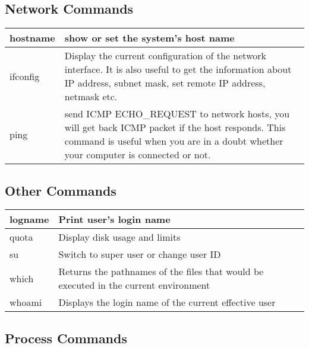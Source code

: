 \subsection{Network Commands}

\begin{tabular}{|p{}|p{}|} \hline
hostname  & show or set the system's host name \\ \hline
ifconfig  & Display the current configuration of the network interface. It is also useful to get the information about IP address, subnet mask, set remote IP address, netmask etc. \\ \hline
ping      & send ICMP ECHO\_REQUEST to network hosts, you will get back ICMP packet if the host responds.  This command is useful when you are in a doubt whether your computer is connected or not. \\ \hline
\end{tabular}


\subsection{Other Commands}
\begin{tabular}{|p{}|p{}|} \hline
logname & Print user's login name \\ \hline
quota   & Display disk usage and limits \\ \hline
su      & Switch to super user or change user ID \\ \hline
which   & Returns the pathnames of the files that would be executed in the current environment \\ \hline
whoami  & Displays the login name of the current effective user \\ \hline
\end{tabular}

\subsection{Process Commands}

